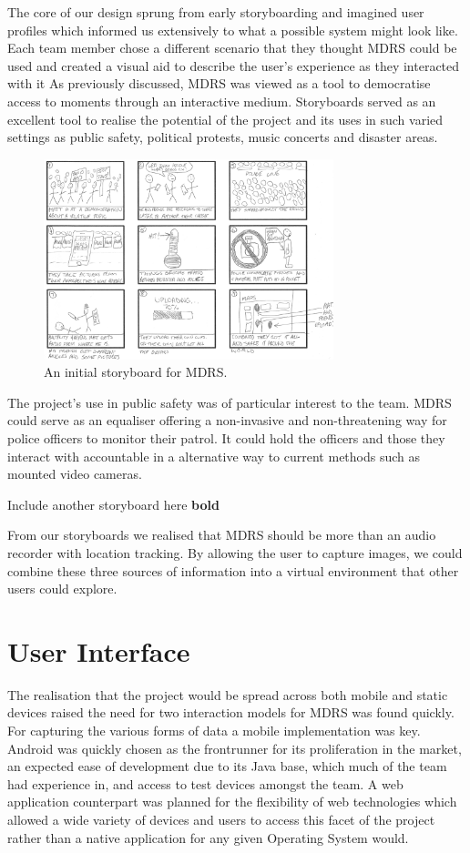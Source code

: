\documentclass{l3proj}
\begin{document}
The core of our design sprung from early storyboarding and imagined user
profiles which informed us extensively to what a possible system might look
like. Each team member chose a different scenario that they thought MDRS could be used and created a visual aid to describe the user's experience as they interacted with it As previously discussed, MDRS was viewed as a tool to democratise access to moments through an interactive medium. Storyboards served as an excellent tool to realise the potential of the project and its uses in such varied settings as public safety, political protests, music concerts and disaster areas.

\begin{figure}[ht!]
  \centering
\includegraphics[width=0.75\textwidth]{images/ally-storyboard.jpg}
\caption{An initial storyboard for MDRS.}
\end{figure}

The project's use in public safety was of particular interest to the team. MDRS could serve as an equaliser offering a non-invasive and non-threatening way for police officers to monitor their patrol. It could hold the officers and those they interact with accountable in a alternative way to current methods such as mounted video cameras.

Include another storyboard here {\bf bold}

From our storyboards we realised that MDRS should be more than an audio recorder with location tracking. By allowing the user to capture images, we could combine these three sources of information into a virtual environment that other users could explore.

\section{User Interface} The realisation that the project would be spread across
both mobile and static devices raised the need for two interaction models for
MDRS was found quickly. For capturing the various forms of data a mobile
implementation was key. Android was quickly chosen as the frontrunner for its
proliferation in the market, an expected ease of development due to its Java
base, which much of the team had experience in, and access to test devices
amongst the team. A web application counterpart was planned for the flexibility
of web technologies which allowed a wide variety of devices and users to access
this facet of the project rather than a native application for any given
Operating System would.
\end{document}
